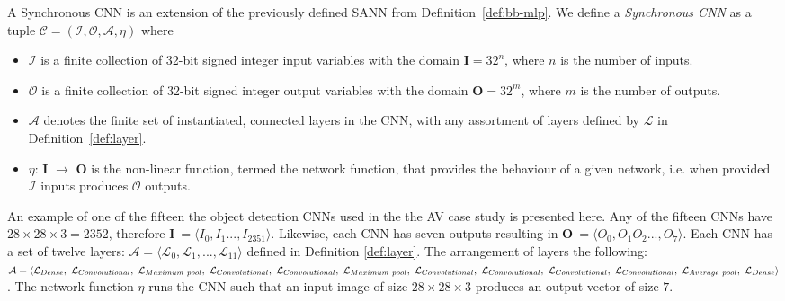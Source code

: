 \begin{definition}
	\label{def:cnn}
	A Synchronous \ac{CNN} is an extension of the previously defined \ac{SANN} from Definition~\ref{def:bb-mlp}. We define a \emph{Synchronous \ac{CNN}} as a tuple $\mathcal{C} = (\mathcal{I}, \mathcal{O}, \mathcal{A}, \eta)$ where
	\begin{itemize}
		\item $\mathcal{I}$ is a finite collection of 32-bit signed integer input variables with the domain \textbf{I}$ = 32^n$, where $n$ is the number of inputs.
		\item $\mathcal{O}$ is a finite collection of 32-bit signed integer output variables with the domain \textbf{O}$ = 32^m$, where $m$ is the number of outputs.
		\item $\mathcal{A}$ denotes the finite set of instantiated, connected layers in the \ac{CNN}, with any assortment of layers defined by $\mathcal{L}$ in Definition~\ref{def:layer}.
		\item $\eta$: \textbf{I} $\rightarrow$ \textbf{O} is the non-linear function, termed the network function, that provides the behaviour of a given network, i.e. when provided $\mathcal{I}$ inputs produces $\mathcal{O}$ outputs. 
	\end{itemize}
\end{definition}

\begin{example}
	\label{ex:cnn}
	An example of one of the fifteen the object detection \acp{CNN} used in the the \ac{AV} case study is presented here.
	Any of the fifteen \acp{CNN} have $28 \times 28 \times 3 = 2352$, therefore \textbf{I}$~= \langle I_0, I_1 ..., I_2351 \rangle$.
	Likewise, each CNN has seven outputs resulting in \textbf{O}$~= \langle O_0, O_1 O_2 ..., O_7 \rangle$.
	Each \ac{CNN} has a set of twelve layers: $\mathcal{A} = \langle\mathcal{L}_0, \mathcal{L}_1, ..., \mathcal{L}_{11}\rangle$ defined in Definition \ref{def:layer}.
	The arrangement of layers the following: $\mathcal{A} = \langle\mathcal{L}_{Dense}, ~\mathcal{L}_{Convolutional},\\~\mathcal{L}_{Maximum~pool}, ~\mathcal{L}_{Convolutional},~\mathcal{L}_{Convolutional}, ~\mathcal{L}_{Maximum~pool},~\mathcal{L}_{Convolutional},~\mathcal{L}_{Convolutional},\\~\mathcal{L}_{Convolutional},~\mathcal{L}_{Convolutional},~\mathcal{L}_{Average~pool},~\mathcal{L}_{Dense}\rangle$.
	The network function $\eta$ runs the \ac{CNN} such that an input image of size $28 \times 28 \times 3$ produces an output vector of size $7$.
\end{example}

